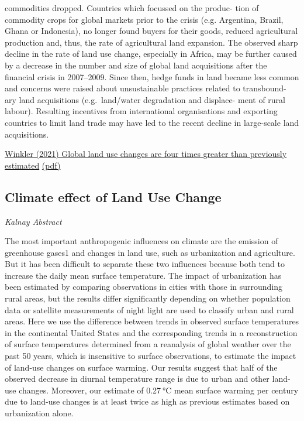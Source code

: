 \documentclass[
]{book}
\begin{document}
commodities dropped. Countries which focussed on the produc-
tion of commodity crops for global markets prior to the crisis (e.g.
Argentina, Brazil, Ghana or Indonesia), no longer found buyers
for their goods, reduced agricultural production and, thus, the
rate of agricultural land expansion. The observed sharp decline in
the rate of land use change, especially in Africa, may
be further caused by a decrease in the number and size of global
land acquisitions after the financial crisis in 2007--2009. Since
then, hedge funds in land became less common and concerns
were raised about unsustainable practices related to transbound-
ary land acquisitions (e.g.~land/water degradation and displace-
ment of rural labour). Resulting incentives from international
organisations and exporting countries to limit land trade may
have led to the recent decline in large-scale land acquisitions.

\href{https://www.nature.com/articles/s41467-021-22702-2}{Winkler (2021) Global land use changes are four times greater than previously estimated}
\href{pdf/Winkler_2021_LUC_4_times_greater.pdf}{(pdf)}

\hypertarget{climate-effect-of-land-use-change}{%
\subsection{Climate effect of Land Use Change}\label{climate-effect-of-land-use-change}}

\emph{Kalnay Abstract}

The most important anthropogenic influences on climate are the emission of greenhouse gases1 and changes in land use, such as urbanization and agriculture. But it has been difficult to separate these two influences because both tend to increase the daily mean surface temperature. The impact of urbanization has been estimated by comparing observations in cities with those in surrounding rural areas, but the results differ significantly depending on whether population data or satellite measurements of night light are used to classify urban and rural areas. Here we use the difference between trends in observed surface temperatures in the continental United States and the corresponding trends in a reconstruction of surface temperatures determined from a reanalysis of global weather over the past 50 years, which is insensitive to surface observations, to estimate the impact of land-use changes on surface warming. Our results suggest that half of the observed decrease in diurnal temperature range is due to urban and other land-use changes. Moreover, our estimate of 0.27 °C mean surface warming per century due to land-use changes is at least twice as high as previous estimates based on urbanization alone.
\end{document}
